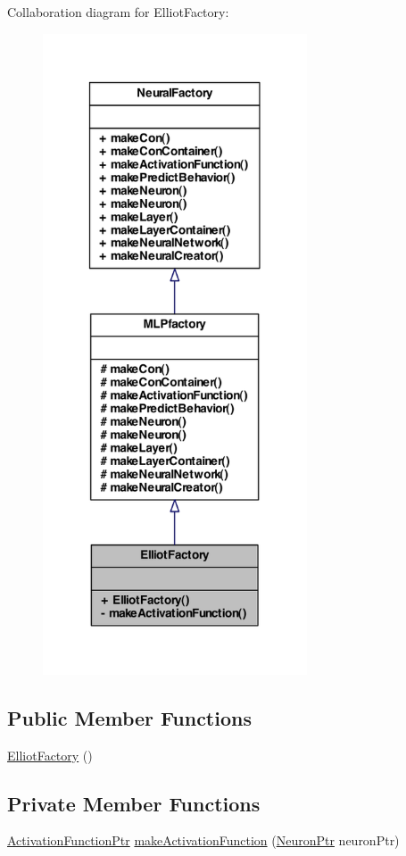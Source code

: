 Collaboration diagram for ElliotFactory:
\nopagebreak
\begin{figure}[H]
\begin{center}
\leavevmode
\includegraphics[width=222pt]{class_elliot_factory__coll__graph}
\end{center}
\end{figure}
\subsection*{Public Member Functions}
\begin{DoxyCompactItemize}
\item 
\hyperlink{class_elliot_factory_a4f9af09bc38293cff6b53cef46222db6}{ElliotFactory} ()
\end{DoxyCompactItemize}
\subsection*{Private Member Functions}
\begin{DoxyCompactItemize}
\item 
\hyperlink{_a_m_o_r_e_8h_a77602a0277a02e5769c3df0adc669b17}{ActivationFunctionPtr} \hyperlink{class_elliot_factory_aedc7054f162dea077b2de6beaa7d1577}{makeActivationFunction} (\hyperlink{_a_m_o_r_e_8h_ac1ea936c2c7728eb382278131652fef4}{NeuronPtr} neuronPtr)
\end{DoxyCompactItemize}


